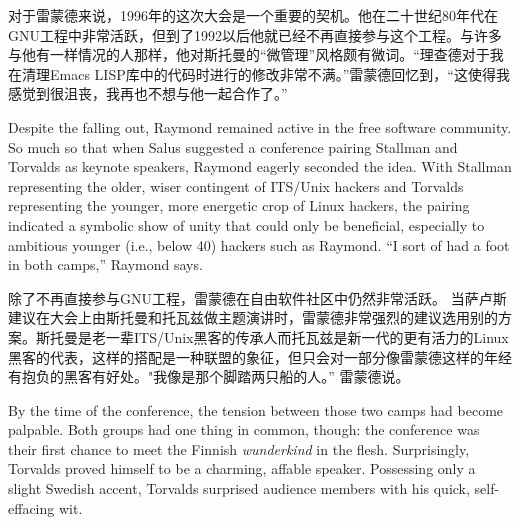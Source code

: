 \ifdefined\chs
对于雷蒙德来说，1996年的这次大会是一个重要的契机。他在二十世纪80年代在GNU工程中非常活跃，但到了1992以后他就已经不再直接参与这个工程。与许多与他有一样情况的人那样，他对斯托曼的“微管理”风格颇有微词。“理查德对于我在清理Emacs LISP库中的代码时进行的修改非常不满。”雷蒙德回忆到，“这使得我感觉到很沮丧，我再也不想与他一起合作了。”
\fi

\ifdefined\eng
Despite the falling out, Raymond remained active in the free software community. So much so that when Salus suggested a conference pairing Stallman and Torvalds as keynote speakers, Raymond eagerly seconded the idea. With Stallman representing the older, wiser contingent of ITS/Unix hackers and Torvalds representing the younger, more energetic crop of Linux hackers, the pairing indicated a symbolic show of unity that could only be beneficial, especially to ambitious younger (i.e., below 40) hackers such as Raymond. ``I sort of had a foot in both camps,'' Raymond says.
\fi

\ifdefined\chs
除了不再直接参与GNU工程，雷蒙德在自由软件社区中仍然非常活跃。 当萨卢斯建议在大会上由斯托曼和托瓦兹做主题演讲时，雷蒙德非常强烈的建议选用别的方案。斯托曼是老一辈ITS/Unix黑客的传承人而托瓦兹是新一代的更有活力的Linux黑客的代表，这样的搭配是一种联盟的象征，但只会对一部分像雷蒙德这样的年经有抱负的黑客有好处。"我像是那个脚踏两只船的人。” 雷蒙德说。
\fi

\ifdefined\eng
By the time of the conference, the tension between those two camps had become palpable. Both groups had one thing in common, though: the conference was their first chance to meet the Finnish \textit{wunderkind} in the flesh. Surprisingly, Torvalds proved himself to be a charming, affable speaker. Possessing only a slight Swedish accent, Torvalds surprised audience members with his quick, self-effacing wit.
\fi

